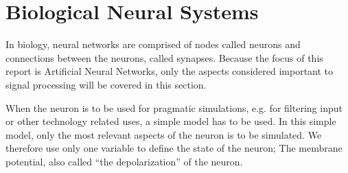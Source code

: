 










\section{Biological Neural Systems} 
\label{secTheBiologicalNeuralSystem}
In biology, neural networks are comprised of nodes called neurons and connections between the neurons, called synapses. 
Because the focus of this report is Artificial Neural Networks, only the aspects considered important to signal processing will be covered in this section.

When the neuron is to be used for pragmatic simulations, e.g. for filtering input or other technology related uses, a simple model has to be used.
In this simple model, only the most relevant aspects of the neuron is to be simulated.
We therefore use only one variable to define the state of the neuron; The membrane potential, also called ``the depolarization'' of the neuron.

